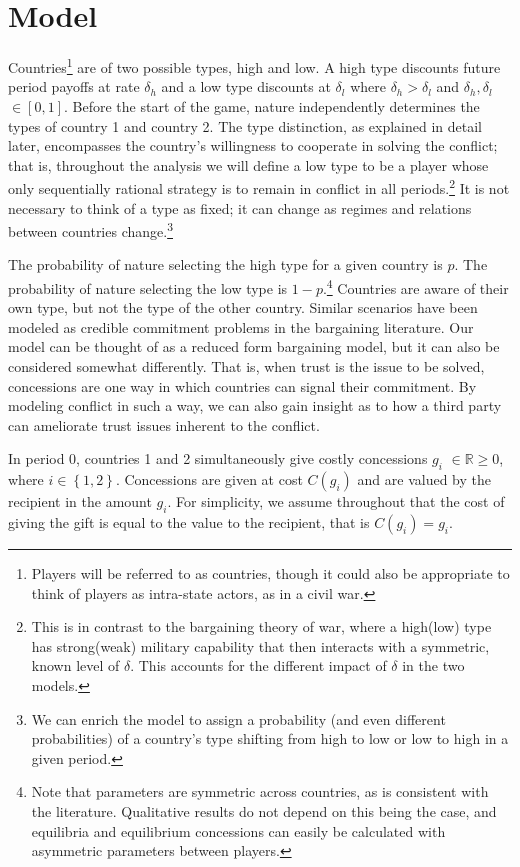 \documentclass[12pt, letterpaper]{article}
\begin{document}
\section{Model}
\label{sec:model} 

Countries\footnote{Players will be referred to as countries, though it could also be appropriate to think of players as intra-state actors, as in a civil war.} are of two possible types, high and low. A high type discounts future period payoffs at rate $\delta_h$ and a low type discounts at $\delta_l$ where $\delta_h >\delta_l$ and $\delta_h ,\delta_l$ $\in [0,1].$ Before the start of the game, nature independently determines the types of country 1 and country 2. The type distinction, as explained in detail later, encompasses the country's willingness to cooperate in solving the conflict; that is, throughout the analysis we will define a low type to be a player whose only sequentially rational strategy is to remain in conflict in all periods.\footnote{This is in contrast to the bargaining theory of war, where a high(low) type has strong(weak) military capability that then interacts with a symmetric, known level of $\delta$. This accounts for the different impact of $\delta$ in the two models.} It is not necessary to think of a type as fixed; it can change as regimes and relations between countries change.\footnote{We can enrich the model to assign a probability (and even different probabilities) of a country's type shifting from high to low or low to high in a given period.}

The probability of nature selecting the high type for a given country is $p$. The probability of nature selecting the low type is $1-p$.\footnote{Note that parameters are symmetric across countries, as is consistent with the literature. Qualitative results do not depend on this being the case, and equilibria and equilibrium concessions can easily be calculated with asymmetric parameters between players.}  Countries are aware of their own type, but not the type of the other country.  Similar scenarios have been modeled as credible commitment problems in the bargaining literature. Our model can be thought of as a reduced form bargaining model, but it can also be considered somewhat differently. That is, when trust is the issue to be solved, concessions are one way in which countries can signal their commitment.  By modeling conflict in such a way, we can also gain insight as to how a third party can ameliorate trust issues inherent to the conflict. 

In period 0, countries 1 and 2 simultaneously give costly concessions $g_i$ $\in \mathbb{R} \geq 0$, where $i\in\left\{1,2\right\}$. Concessions are given at cost $C(g_i)$ and are valued by the recipient in the amount $g_i$. For simplicity, we assume throughout that the cost of giving the gift is equal to the value to the recipient, that is $C(g_i)= g_i$.
\end{document}
